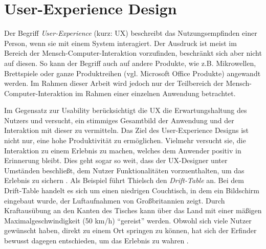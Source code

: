 \section{User-Experience Design} \label{sec:uxd}
Der Begriff \textit{User-Experience} (kurz: UX) beschreibt das Nutzungsempfinden einer Person, wenn sie mit einem System interagiert. Der Ausdruck ist meist im Bereich der Mensch-Computer-Interaktion vorzufinden, beschränkt sich aber nicht auf diesen. \cite{Gube2010} So kann der Begriff auch auf andere Produkte, wie z.B. Mikrowellen, Brettspiele oder ganze Produktreihen (vgl. Microsoft Office Produkte) angewandt werden. Im Rahmen dieser Arbeit wird jedoch nur der Teilbereich der Mensch-Computer-Interaktion im Rahmen einer einzelnen Anwendung betrachtet. \par
Im Gegensatz zur Usability berücksichtigt die UX die Erwartungshaltung des Nutzers und versucht, ein stimmiges Gesamtbild der Anwendung und der Interaktion mit dieser zu vermitteln. Das Ziel des User-Experience Designs ist nicht nur, eine hohe Produktivität zu ermöglichen. Vielmehr versucht sie, die Interaktion zu einem Erlebnis zu machen, welches dem Anwender positiv in Erinnerung bleibt. Dies geht sogar so weit, dass der UX-Designer unter Umständen beschließt, dem Nutzer Funktionalitäten vorzuenthalten, um das Erlebnis zu sichern \cite{Thielsch2015}. Als Beispiel führt Thielsch den \textit{Drift-Table} an. Bei dem Drift-Table handelt es sich um einen niedrigen Couchtisch, in dem ein Bildschirm eingebaut wurde, der Luftaufnahmen von Großbritannien zeigt. Durch Kraftausübung an den Kanten des Tisches kann über das Land mit einer mäßigen Maximalgeschwindigkeit (50 km/h) \enquote{gereist} werden. Obwohl sich viele Nutzer gewünscht haben, direkt zu einem Ort springen zu können, hat sich der Erfinder bewusst dagegen entschieden, um das Erlebnis zu wahren \cite{Thielsch2015}.\par
